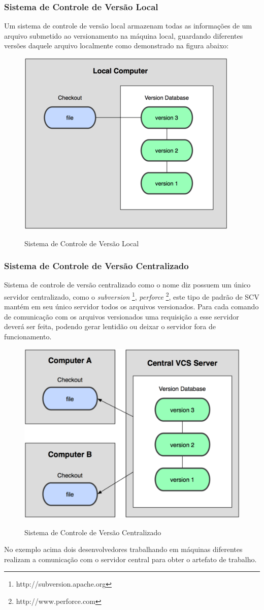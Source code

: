 \subsubsection{Sistema de Controle de Versão Local}
Um sistema de controle de versão local	armazenam todas as informações de um arquivo submetido ao versionamento na máquina local, guardando diferentes versões daquele arquivo localmente como demonstrado na figura abaixo:
\begin{figure}[tbh]
\centering
\caption[Sistema de Controle de Versão Local]{Sistema de Controle de Versão Local}
\includegraphics[width=0.7\linewidth]{./images/scvlocal}
\label{fig:SCVLocal}
\end{figure}
\subsubsection{Sistema de Controle de Versão Centralizado} Sistema de controle de versão centralizado como o nome diz possuem um único servidor centralizado, como o \textit{subversion} \footnote{http://subversion.apache.org}, \textit{perforce} \footnote{http://www.perforce.com}, este tipo de padrão de SCV mantém em seu único servidor todos os arquivos versionados. Para cada comando de comunicação com os arquivos versionados uma requisição a esse servidor deverá ser feita, podendo gerar lentidão ou deixar o servidor fora de funcionamento.
\begin{figure}[tbh]
\centering
\caption[Sistema de Controle de Versão Centralizado]{Sistema de Controle de Versão Centralizado}
\includegraphics[width=0.7\linewidth]{./images/scvcentral}
\label{fig:SCVCentral}
\end{figure}
No exemplo acima dois desenvolvedores trabalhando em máquinas diferentes realizam a comunicação com o servidor central para obter o artefato de trabalho.	
